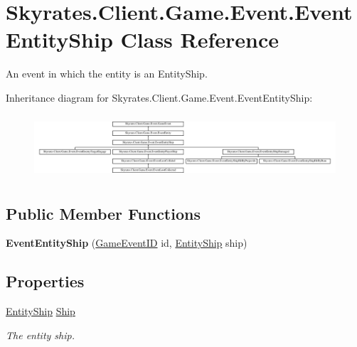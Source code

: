\hypertarget{class_skyrates_1_1_client_1_1_game_1_1_event_1_1_event_entity_ship}{\section{Skyrates.\-Client.\-Game.\-Event.\-Event\-Entity\-Ship Class Reference}
\label{class_skyrates_1_1_client_1_1_game_1_1_event_1_1_event_entity_ship}
}


An event in which the entity is an Entity\-Ship.  


Inheritance diagram for Skyrates.\-Client.\-Game.\-Event.\-Event\-Entity\-Ship\-:\begin{figure}[H]
\begin{center}
\leavevmode
\includegraphics[height=2.386364cm]{class_skyrates_1_1_client_1_1_game_1_1_event_1_1_event_entity_ship}
\end{center}
\end{figure}
\subsection*{Public Member Functions}
\begin{DoxyCompactItemize}
\item 
\hypertarget{class_skyrates_1_1_client_1_1_game_1_1_event_1_1_event_entity_ship_a21ae1f26af04bed9f7fff19e1d997ec3}{{\bfseries Event\-Entity\-Ship} (\hyperlink{namespace_skyrates_1_1_client_1_1_game_1_1_event_a3a7e5dc62ad299d5e53abb4a3e5d5088}{Game\-Event\-I\-D} id, \hyperlink{class_skyrates_1_1_client_1_1_entity_1_1_entity_ship}{Entity\-Ship} ship)}\label{class_skyrates_1_1_client_1_1_game_1_1_event_1_1_event_entity_ship_a21ae1f26af04bed9f7fff19e1d997ec3}

\end{DoxyCompactItemize}
\subsection*{Properties}
\begin{DoxyCompactItemize}
\item 
\hyperlink{class_skyrates_1_1_client_1_1_entity_1_1_entity_ship}{Entity\-Ship} \hyperlink{class_skyrates_1_1_client_1_1_game_1_1_event_1_1_event_entity_ship_aaac97a0d035d3163af76aa5f67bc9c5c}{Ship}
\begin{DoxyCompactList}\small\item\em The entity ship. \end{DoxyCompactList}\end{DoxyCompactItemize}
